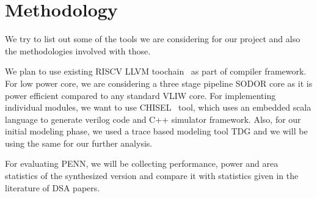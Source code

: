 \section{Methodology }\label{sec:meth}
We try to list out some of the tools we are considering for our project and also the methodologies involved with those.

We plan to use existing RISCV LLVM toochain~\cite{nguyenlinux} as part of compiler framework. 
For low power core, we are considering a three stage pipeline SODOR core as it is power efficient compared to any standard VLIW core. 
For implementing individual modules, we want to use CHISEL~\cite{chisel2012} tool, which uses an embedded scala language to generate verilog code and C++ simulator
framework. Also, for our initial modeling phase, we used a trace based modeling tool TDG and we will be using the same for our further analysis.   

For evaluating PENN, we will be collecting performance, power and area statistics of the synthesized version and compare it with statistics 
given in the literature of DSA papers. 
